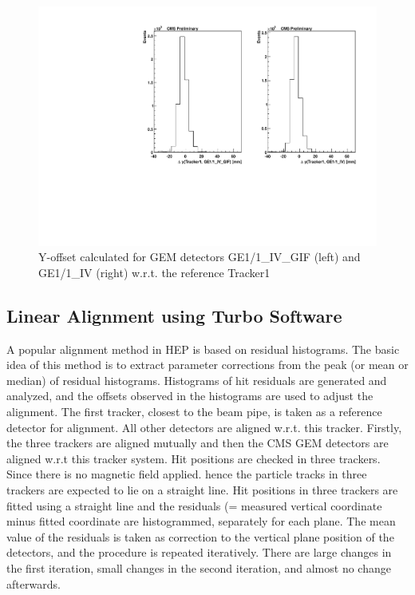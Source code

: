 \begin{figure}[!htbp]
\centering
\includegraphics[width=5.1in]{figures/GEM/Offset_1vsGEM_y_For_Run1897.pdf}
\caption{Y-offset calculated for GEM detectors GE1/1\_IV\_GIF (left) and GE1/1\_IV (right) w.r.t. the reference Tracker1}\label{fig:offGEM2}
\end{figure}



\subsection{Linear Alignment using Turbo Software}

A popular alignment method in HEP is based on residual histograms. The basic idea of this method is to extract parameter corrections from the peak (or mean or median) of residual histograms. Histograms of hit residuals are generated and analyzed, and the offsets observed in the histograms are used to adjust the alignment.
The first tracker, closest to the beam pipe, is taken as a reference detector for alignment. All other detectors are aligned w.r.t. this tracker. Firstly, the three trackers are aligned mutually and then the CMS GEM detectors are aligned w.r.t this tracker system. Hit positions are checked in three trackers. Since there is no magnetic field applied. hence the particle tracks in three trackers are expected to lie on a straight line. Hit positions in three trackers are fitted using a straight line and the residuals (= measured vertical coordinate minus fitted coordinate are histogrammed, separately for each plane. The mean value of the residuals is taken as correction to the vertical plane position of the detectors, and the procedure is repeated iteratively. There are large changes in the first iteration, small changes in the second iteration, and almost no change afterwards.

